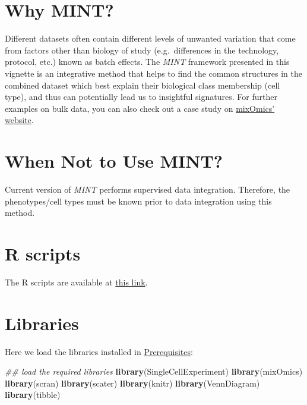 \documentclass[]{book}
\newenvironment{Shaded}{\begin{snugshade}}{\end{snugshade}}
\newcommand{\CommentTok}[1]{\textcolor[rgb]{0.56,0.35,0.01}{\textit{#1}}}
\newcommand{\KeywordTok}[1]{\textcolor[rgb]{0.13,0.29,0.53}{\textbf{#1}}}
\newcommand{\NormalTok}[1]{#1}
\theoremstyle{definition}
\theoremstyle{definition}
\theoremstyle{definition}
\theoremstyle{remark}
\begin{document}
\hypertarget{why-mint}{%
\section{Why MINT?}\label{why-mint}}

Different datasets often contain different levels of unwanted variation
that come from factors other than biology of study (e.g.~differences in
the technology, protocol, etc.) known as batch effects. The \emph{MINT}
framework presented in this vignette is an integrative method that helps
to find the common structures in the combined dataset which best explain
their biological class membership (cell type), and thus can potentially
lead us to insightful signatures. For further examples on bulk data, you
can also check out a case study on
\href{http://mixomics.org/mixmint/stemcells-example/}{mixOmics'
website}.

\hypertarget{when-not-to-use-mint}{%
\section{When Not to Use MINT?}\label{when-not-to-use-mint}}

Current version of \emph{MINT} performs supervised data integration.
Therefore, the phenotypes/cell types must be known prior to data
integration using this method.

\hypertarget{r-scripts}{%
\section{R scripts}\label{r-scripts}}

The R scripts are available at
\href{https://github.com/AJABADI/MINT_sPLSDA/blob/master/01-Data-Integration.R}{this
link}.

\hypertarget{libraries}{%
\section{Libraries}\label{libraries}}

Here we load the libraries installed in
\protect\hyperlink{prerequisites}{Prerequisites}:

\begin{Shaded}
\begin{Highlighting}[]
\CommentTok{## load the required libraries}
\KeywordTok{library}\NormalTok{(SingleCellExperiment)}
\KeywordTok{library}\NormalTok{(mixOmics)}
\KeywordTok{library}\NormalTok{(scran)}
\KeywordTok{library}\NormalTok{(scater)}
\KeywordTok{library}\NormalTok{(knitr)}
\KeywordTok{library}\NormalTok{(VennDiagram)}
\KeywordTok{library}\NormalTok{(tibble)}
\end{Highlighting}
\end{Shaded}
\end{document}
